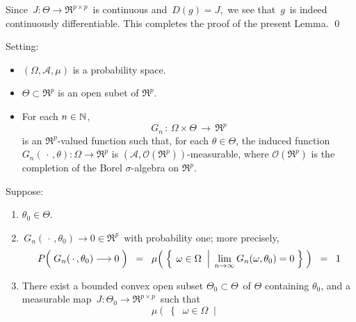 \vskip 0.5cm
\noindent
Since \,$J : \Theta \longrightarrow \Re^{p \times p}$\, is continuous and \,$D(g) = J$,\,
we see that \,$g$\, is indeed continuously differentiable.
This completes the proof of the present Lemma.
\qed


\vskip 1.0cm
\begin{lemma}
\mbox{}\vskip 0.1cm
\noindent
Setting:
\begin{itemize}
\item
	$(\Omega,\mathcal{A},\mu)$ is a probability space.
\item
	$\Theta \subset \Re^{p}$ is an open subet of $\Re^{p}$.
\item
	For each $n \in \mathbb{N}$,
	\begin{equation*}
	G_{n} \, : \, \Omega \times \Theta \, \longrightarrow \, \Re^{p}
	\end{equation*}
	is an $\Re^{p}$-valued function such that, for each $\theta \in \Theta$,
	the induced function $G_{n}(\,\cdot\,,\theta) : \Omega \longrightarrow \Re^{p}$
	is $(\mathcal{A},\mathcal{O}(\Re^{p}))$-measurable, where
	$\mathcal{O}(\Re^{p})$ is the completion of
	the Borel $\sigma$-algebra on $\Re^{p}$.
\end{itemize}
\renewcommand{\theenumi}{\alph{enumi}}
\renewcommand{\labelenumi}{\textnormal{(\theenumi)}$\;\;$}
Suppose:
\begin{enumerate}
\item
	$\theta_{0} \in \Theta$.
\item
	\,$G_{n}(\,\cdot\,,\theta_{0}) \longrightarrow 0\in\Re^{p}$\, with probability one; more precisely,
	\begin{equation*}
	P\!\left(\;
		G_{n}(\,\cdot\,,\theta_{0}) \overset{{\color{white}-}}{\longrightarrow} 0
		\;\right)
	\;\; = \;\;
		\mu\!\left(\;\left\{\;
			\left.
			\omega \overset{{\color{white}.}}{\in} \Omega
			\;\;\right\vert\;
			\underset{n\rightarrow\infty}{\lim}\,G_{n}(\omega,\theta_{0}) = 0
			\;\right\}\;\right)
	\;\; = \;\;
		1
	\end{equation*}
\item
	There exist a bounded convex open subset \;$\Theta_{0} \subset \Theta$\, of \;$\Theta$ containing $\theta_{0}$,
	and a measurable map
	\,$J : \Theta_{0} \longrightarrow \Re^{p \times p}$\,
	such that %
	\begin{equation*}
	\mu\!\left(\;\left\{\;\;
		\omega \in \Omega
		\;\;\left\vert\;
		\begin{array}{c}

\end{array}
\end{equation*}
\end{enumerate}
\end{lemma}
